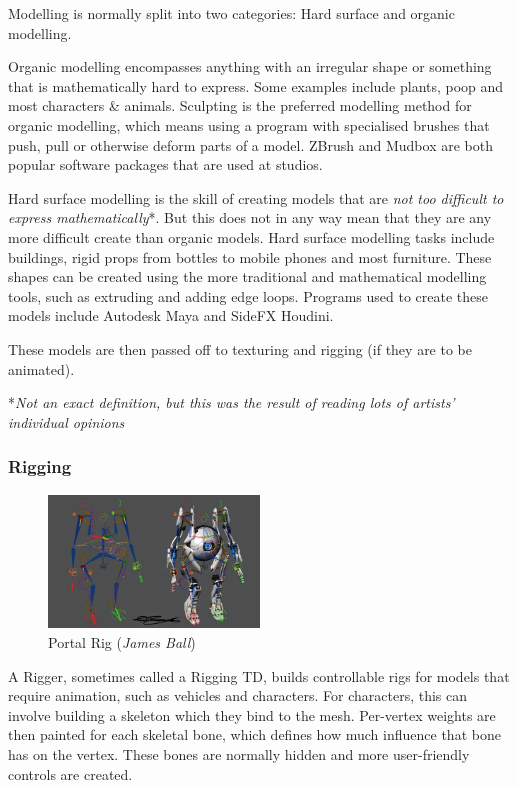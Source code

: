 Modelling is normally split into two categories: Hard surface and organic modelling.

Organic modelling encompasses anything with an irregular shape or something that is mathematically hard to express. Some examples include plants, poop and most characters \& animals. Sculpting is the preferred modelling method for organic modelling, which means using a program with specialised brushes that push, pull or otherwise deform parts of a model. ZBrush and Mudbox are both popular software packages that are used at studios.

Hard surface modelling is the skill of creating models that are \emph{not too difficult to express mathematically}*. But this does not in any way mean that they are any more difficult create than organic models. Hard surface modelling tasks include buildings, rigid props from bottles to mobile phones and most furniture. These shapes can be created using the more traditional and mathematical modelling tools, such as extruding and adding edge loops. Programs used to create these models include Autodesk Maya and SideFX Houdini.

These models are then passed off to texturing and rigging (if they are to be animated).

*\emph{Not an exact definition, but this was the result of reading lots of artists' individual opinions}

\hypertarget{rigging}{%
\subsubsection{Rigging}\label{rigging}}

\begin{figure}
\includegraphics[width=0.5\textwidth,height=\textheight]{./images/portal_rig.png}
\caption{Portal Rig (\emph{James Ball})}
\end{figure}

A Rigger, sometimes called a Rigging TD, builds controllable rigs for models that require animation, such as vehicles and characters. For characters, this can involve building a skeleton which they bind to the mesh. Per-vertex weights are then painted for each skeletal bone, which defines how much influence that bone has on the vertex. These bones are normally hidden and more user-friendly controls are created.

